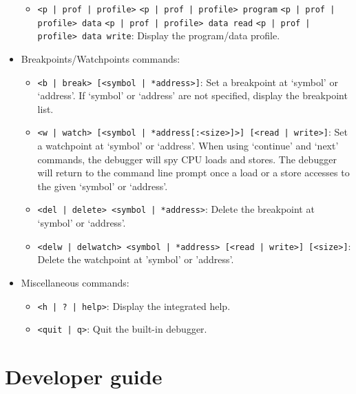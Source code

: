 \begin{itemize}
\begin{itemize}
	\item \texttt{<p | prof | profile>} \newline
	\texttt{<p | prof | profile> program} \newline
	\texttt{<p | prof | profile> data} \newline
	\texttt{<p | prof | profile> data read} \newline
	\texttt{<p | prof | profile> data write}: \newline
	Display the program/data profile.
	\end{itemize}
\item Breakpoints/Watchpoints commands:
	\begin{itemize}
	\item \texttt{<b | break> [<symbol | *address>]}: \newline
	Set a breakpoint at `symbol' or `address'. If `symbol' or `address' are not specified, display the breakpoint list.
	\item \texttt{<w | watch> [<symbol | *address[:<size>]>] [<read | write>]}: \newline
	Set a watchpoint at `symbol' or `address'. When using `continue' and `next' commands, the debugger will spy CPU loads and stores. The debugger will return to the command line prompt once a load or a store accesses to the given `symbol' or `address'.
	\item \texttt{<del | delete> <symbol | *address>}: \newline
	Delete the breakpoint at `symbol' or `address'.
	\item \texttt{<delw | delwatch> <symbol | *address> [<read | write>] [<size>]}: \newline
	Delete the watchpoint at 'symbol' or 'address'.
	\end{itemize}
\item Miscellaneous commands:
	\begin{itemize}
	\item \texttt{<h | ? | help>}: \newline
	Display the integrated help.
	\item \texttt{<quit | q>}: \newline
	Quit the built-in debugger.
	\end{itemize}
\end{itemize}

\newpage
\section{Developer guide}

